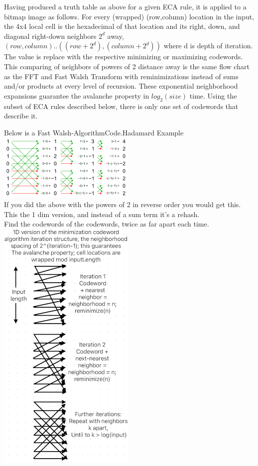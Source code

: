 \documentclass[11pt]{article}
\begin{document}
Having produced a truth table as above for a given ECA rule, it is applied to a bitmap image as follows. For every (wrapped) (row,column) location in the input, the 4x4 local cell is the hexadecimal of that location and its right, down, and diagonal right-down neighbors $2^d$ away, $(row,column)..((row+2^d),(column+2^d))$  where d is depth of iteration. The value is replace with the respective minimizing or maximizing codewords. This comparing of neighbors of powers of 2 distance away is the same flow chart as the FFT and Fast Walsh Transform with reminimizations instead of sums and/or products at every level of recursion. These exponential neighborhood expansions guarantee the avalanche property in $log_2(size)$ time. Using the subset of ECA rules described below, there is only one set of codewords that describe it.\\
\begin{center}
Below is a Fast Walsh-AlgorithmCode.Hadamard Example \cite{enwiki:1261916659}\\
\includegraphics{FastWalshHadamard}\\
If you did the above with the powers of 2 in reverse order you would get this. \\
This the 1 dim version, and instead of a sum term it's a rehash.\\ 
Find the codewords of the codewords, twice as far apart each time.\\
\includegraphics{AlgoStruct}\\
\end{center}
\end{document}
